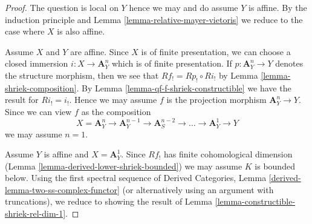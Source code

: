 \documentclass{stacks-project}
\theoremstyle{plain}
\theoremstyle{definition}
\theoremstyle{remark}
\numberwithin{equation}{subsection}
\begin{document}
\begin{proof}
The question is local on $Y$ hence we may and do assume $Y$ is affine.
By the induction principle and Lemma \ref{lemma-relative-mayer-vietoris}
we reduce to the case where $X$ is also affine.

\medskip\noindent
Assume $X$ and $Y$ are affine. Since $X$ is of finite presentation,
we can choose a closed immersion $i : X \to \mathbf{A}^n_Y$ which is
of finite presentation. If $p : \mathbf{A}^n_Y \to Y$ denotes
the structure morphism, then we see that $Rf_! = Rp_! \circ Ri_!$
by Lemma \ref{lemma-shriek-composition}. By
Lemma \ref{lemma-qf-f-shriek-constructible}
we have the result for $Ri_! = i_!$. Hence we may assume $f$
is the projection morphism $\mathbf{A}^n_Y \to Y$.
Since we can view $f$ as the composition
$$
X = \mathbf{A}^n_Y \to \mathbf{A}^{n - 1}_Y \to
\mathbf{A}^{n - 2}_S \to \ldots \to
\mathbf{A}^1_Y \to Y
$$
we may assume $n = 1$.

\medskip\noindent
Assume $Y$ is affine and $X = \mathbf{A}^1_Y$. Since $Rf_!$ has
finite cohomological dimension
(Lemma \ref{lemma-derived-lower-shriek-bounded})
we may assume $K$ is bounded below. Using the first spectral sequence of
Derived Categories, Lemma \ref{derived-lemma-two-ss-complex-functor}
(or alternatively using an argument with truncations),
we reduce to showing the result of
Lemma \ref{lemma-constructible-shriek-rel-dim-1}.
\end{proof}
\end{document}
